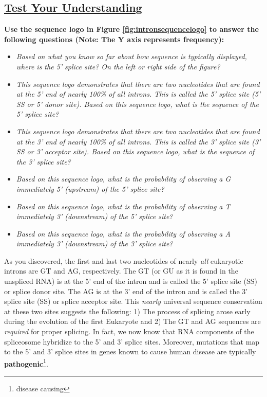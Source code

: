 \documentclass[
]{book}
\providecommand{\tightlist}{%
  \setlength{\itemsep}{0pt}\setlength{\parskip}{0pt}}
\begin{document}
\hypertarget{test-your-understanding-18}{%
\subsection{\texorpdfstring{\href{https://docs.google.com/forms/d/e/1FAIpQLSdLNDxLkxtahAy52dMlJSxcah4fFO6CYDbCJRAqizq7ux14IQ/viewform?usp=sf_link}{Test Your Understanding}}{Test Your Understanding}}\label{test-your-understanding-18}}

\textbf{Use the sequence logo in Figure \ref{fig:intronsequencelogo} to answer the following questions (Note: The Y axis represents frequency):}

\begin{itemize}
\tightlist
\item
  \emph{Based on what you know so far about how sequence is typically displayed, where is the 5' splice site? On the left or right side of the figure?}
\item
  \emph{This sequence logo demonstrates that there are two nucleotides that are found at the 5' end of nearly 100\% of all introns. This is called the 5' splice site (5' SS or 5' donor site). Based on this sequence logo, what is the sequence of the 5' splice site?}
\item
  \emph{This sequence logo demonstrates that there are two nucleotides that are found at the 3' end of nearly 100\% of all introns. This is called the 3' splice site (3' SS or 3' acceptor site). Based on this sequence logo, what is the sequence of the 3' splice site?}
\item
  \emph{Based on this sequence logo, what is the probability of observing a G immediately 5' (upstream) of the 5' splice site?}
\item
  \emph{Based on this sequence logo, what is the probability of observing a T immediately 3' (downstream) of the 5' splice site?}
\item
  \emph{Based on this sequence logo, what is the probability of observing a A immediately 3' (downstream) of the 3' splice site?}
\end{itemize}

As you discovered, the first and last two nucleotides of nearly \emph{all} eukaryotic introns are GT and AG, respectively. The GT (or GU as it is found in the unspliced RNA) is at the 5' end of the intron and is called the 5' splice site (SS) or splice donor site. The AG is at the 3' end of the intron and is called the 3' splice site (SS) or splice acceptor site. This \emph{nearly} universal sequence conservation at these two sites suggests the following: 1) The process of splicing arose early during the evolution of the first Eukaryote and 2) The GT and AG sequences are \emph{required} for proper splicing. In fact, we now know that RNA components of the spliceosome hybridize to the 5' and 3' splice sites. Moreover, mutations that map to the 5' and 3' splice sites in genes known to cause human disease are typically \textbf{pathogenic}\footnote{disease causing}.
\end{document}
